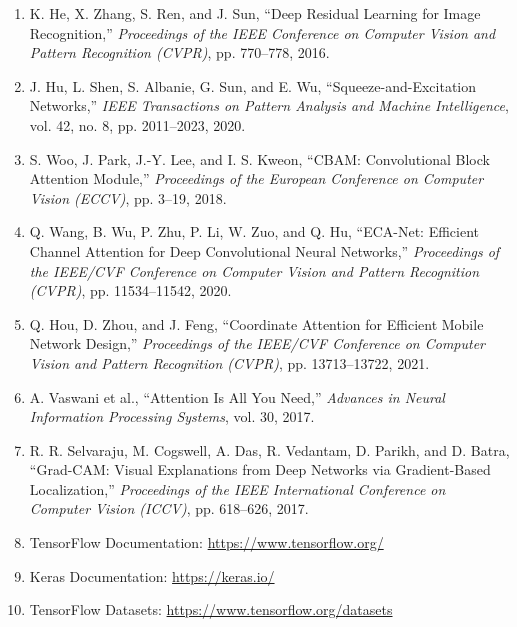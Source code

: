 \documentclass[10pt]{article}
\begin{document}
\begin{enumerate}

\item
K. He, X. Zhang, S. Ren, and J. Sun,
``Deep Residual Learning for Image Recognition,''
\textit{Proceedings of the IEEE Conference on Computer Vision and Pattern
Recognition (CVPR)}, pp. 770--778, 2016.

\item
J. Hu, L. Shen, S. Albanie, G. Sun, and E. Wu,
``Squeeze-and-Excitation Networks,''
\textit{IEEE Transactions on Pattern Analysis and Machine Intelligence},
vol. 42, no. 8, pp. 2011--2023, 2020.

\item
S. Woo, J. Park, J.-Y. Lee, and I. S. Kweon,
``CBAM: Convolutional Block Attention Module,''
\textit{Proceedings of the European Conference on Computer Vision (ECCV)},
pp. 3--19, 2018.

\item
Q. Wang, B. Wu, P. Zhu, P. Li, W. Zuo, and Q. Hu,
``ECA-Net: Efficient Channel Attention for Deep Convolutional Neural
Networks,''
\textit{Proceedings of the IEEE/CVF Conference on Computer Vision and Pattern
Recognition (CVPR)}, pp. 11534--11542, 2020.

\item
Q. Hou, D. Zhou, and J. Feng,
``Coordinate Attention for Efficient Mobile Network Design,''
\textit{Proceedings of the IEEE/CVF Conference on Computer Vision and Pattern
Recognition (CVPR)}, pp. 13713--13722, 2021.

\item
A. Vaswani et al.,
``Attention Is All You Need,''
\textit{Advances in Neural Information Processing Systems},
vol. 30, 2017.

\item
R. R. Selvaraju, M. Cogswell, A. Das, R. Vedantam,
D. Parikh, and D. Batra,
``Grad-CAM: Visual Explanations from Deep Networks via
Gradient-Based Localization,''
\textit{Proceedings of the IEEE International Conference on Computer Vision
(ICCV)}, pp. 618--626, 2017.

\item
TensorFlow Documentation:
\url{https://www.tensorflow.org/}

\item
Keras Documentation:
\url{https://keras.io/}

\item
TensorFlow Datasets:
\url{https://www.tensorflow.org/datasets}

\end{enumerate}

\end{document}
